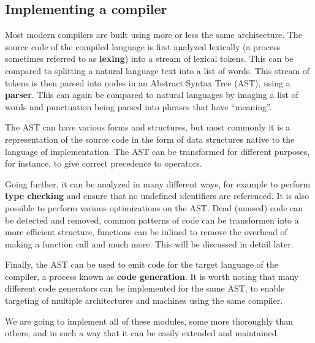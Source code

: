 \subsection{Implementing a compiler}
Most modern compilers are built using more or less the same architecture. The source code of the compiled language is first analyzed lexically (a process sometimes referred to as \textbf{lexing}) into a stream of lexical tokens. This can be compared to splitting a natural language text into a list of words. This stream of tokens is then parsed into nodes in an Abstract Syntax Tree (AST), using a \textbf{parser}. This can again be compared to natural languages by imaging a list of words and punctuation being parsed into phrases that have ``meaning''.

The AST can have various forms and structures, but most commonly it is a representation of the source code in the form of data structures native to the language of implementation. The AST can be transformed for different purposes, for instance, to give correct precedence to operators.

Going further, it can be analyzed in many different ways, for example to perform \textbf{type checking} and ensure that no undefined identifiers are referenced. It is also possible to perform various optimizations on the AST. Dead (unused) code can be detected and removed, common patterns of code can be transformen into a more efficient structure, functions can be inlined to remove the overhead of making a function call and much more. This will be discussed in detail later.

Finally, the AST can be used to emit code for the target language of the compiler, a process known as \textbf{code generation}. It is worth noting that many different code generators can be implemented for the same AST, to enable targeting of multiple architectures and machines using the same compiler.

We are going to implement all of these modules, some more thoroughly than others, and in such a way that it can be easily extended and maintained.
